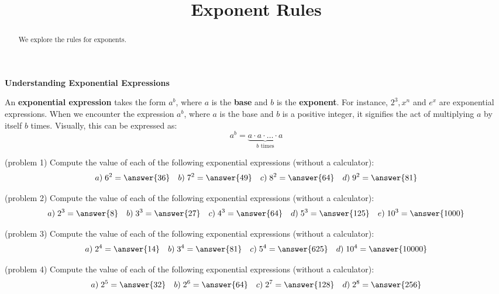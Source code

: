 \documentclass[handout]{ximera}
\title{Exponent Rules}
\begin{document}
\begin{abstract}
We explore the rules for exponents.
\end{abstract}



\maketitle

\begin{center}
\textbf{Understanding Exponential Expressions}
\end{center}

An \textbf{exponential expression} takes the form $a^b$, where $a$ is the \textbf{base}  and 
$b$ is the \textbf{exponent}.
For instance, $2^3, x^n$ and $e^x$ are exponential expressions. When we encounter the expression $a^b$, 
where $a$ is the base and $b$ is a positive integer, it signifies the act of multiplying $a$
by itself $b$ times. Visually, this can be expressed as:
\[
a^b = \underbrace{a \cdot a \cdot \ldots \cdot a}_\text{$b$ times} 
\]


\begin{problem}(problem 1)
Compute the value of each of the following exponential expressions (without a calculator):
\[
a) \;6^2 = \answer{36} \quad b) \;7^2 = \answer{49} \quad c) \;8^2 = \answer{64} \quad d) \;9^2 = \answer{81}
\]
\end{problem}

\begin{problem}(problem 2)
Compute the value of each of the following exponential expressions (without a calculator):
\[
a) \;2^3 = \answer{8} \quad b) \;3^3 = \answer{27} \quad c) \;4^3 = \answer{64} \quad d) \;5^3 = \answer{125} 
\quad e) \;10^3 = \answer{1000}
\]
\end{problem}

\begin{problem}(problem 3)
Compute the value of each of the following exponential expressions (without a calculator):
\[
a) \;2^4 = \answer{14} \quad b) \;3^4 = \answer{81} \quad c) \;5^4 = \answer{625} \quad d) \;10^4 = \answer{10000}
\]
\end{problem}

\begin{problem}(problem 4)
Compute the value of each of the following exponential expressions (without a calculator):
\[
a) \;2^5 = \answer{32} \quad b) \;2^6 = \answer{64} \quad c) \;2^7 = \answer{128} \quad d) \;2^8 = \answer{256}
\]
\end{problem}
\end{document}

